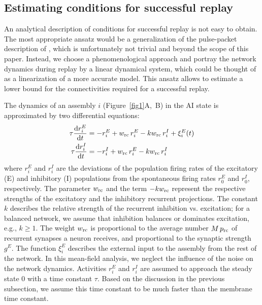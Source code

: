   \subsection{Estimating conditions for successful replay}
    An analytical description of conditions for successful replay is not easy
    to obtain. The most appropriate ansatz would be a generalization of the
    pulse-packet description of \cite{Goedeke2008}, which
    is unfortunately not trivial and beyond the scope of this paper. Instead,
    we choose a phenomenological approach and portray the network dynamics
    during replay by a linear dynamical system, which could be thought of as a
    linearization of a more accurate model. This ansatz allows to estimate a
    lower bound for the connectivities required for a successful replay.

    The dynamics of an assembly $i$ (Figure~\ref{fig1}A,~B) in the AI state is
    approximated by two differential equations:
    \begin{equation}
      \begin{split}
        \tau \frac{\text{d}r_{i}^E}{\text{d}t} &= - r_{i}^E + w_{\rm rc} \, r_{i}^E -kw_{\rm rc} \, r_{i}^I + \xi_{i}^{E}(t)\\
        \tau \frac{\text{d}r_{i}^I}{\text{d}t} &= - r_{i}^I + w_{\rm rc} \, r_{i}^E -kw_{\rm rc} \, r_{i}^I \\
      \end{split}
      \label{eq:EI_dynamics}
    \end{equation}
    where $r_{i}^E$ and $r_{i}^I$ are the deviations of the population firing
    rates of the excitatory (E) and inhibitory (I) populations from the
    spontaneous firing rates $r_0^E$ and $r_0^I$, respectively. The parameter
    $w_{\rm rc}$ and the term $-kw_{\rm rc}$ represent the respective strengths
    of the excitatory and the inhibitory recurrent projections. The constant
    $k$ describes the relative strength of the recurrent inhibition vs.
    excitation; for a balanced network, we assume that inhibition balances or
    dominates excitation, e.g., $k \geq 1$. The weight $w_{\rm rc}$ is
    proportional to the average number $M \, p_{\rm rc}$ of recurrent synapses
    a neuron receives, and proportional to the synaptic strength $g^E$. The
    function $\xi_{i}^E$ describes the external input to the assembly from the
    rest of the network. In this mean-field analysis, we neglect the influence
    of the noise on the network dynamics. Activities $r_{i}^E$ and $r_{i}^I$
    are assumed to approach the steady state $0$ with a time constant $\tau$.
    Based on the discussion in the previous subsection, we assume this time
    constant to be much faster than the membrane time constant. 

